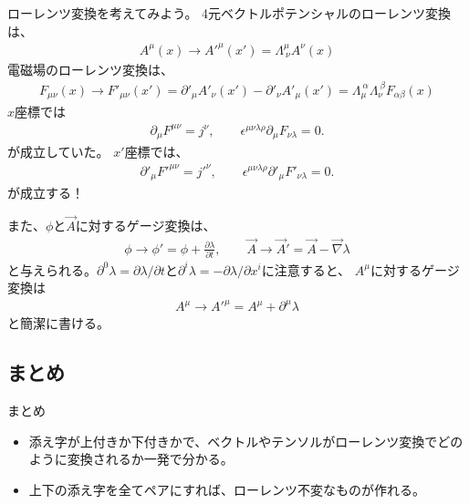 \documentclass[10pt,a4paper]{jarticle}
\begin{document}
ローレンツ変換を考えてみよう。
4元ベクトルポテンシャルのローレンツ変換は、
\begin{align}
A^\mu(x) \to {A'}^\mu(x') = \Lambda^\mu_{~\nu} A^\nu(x)
\end{align}
%
電磁場のローレンツ変換は、
\begin{align}
F_{\mu\nu}(x)
\to
F'_{\mu\nu}(x') = \partial'_\mu A'_\nu(x') - \partial'_\nu A'_\mu(x') = 
\Lambda_\mu^{~\alpha} \Lambda_\nu^{~\beta} F_{\alpha\beta}(x)
\end{align}
%
$x$座標では
\begin{align}
\partial_\mu F^{\mu\nu} = j^\nu, \qquad
\epsilon^{\mu\nu\lambda\rho} \partial_\mu F_{\nu\lambda} = 0.
\end{align}
が成立していた。
$x'$座標では、
\begin{align}
\partial'_\mu {F'}^{\mu\nu} = {j'}^\nu, \qquad
\epsilon^{\mu\nu\lambda\rho} \partial'_\mu {F'}_{\nu\lambda} = 0.
\end{align}
が成立する！

また、$\phi$と$\vec A$に対するゲージ変換は、
\begin{align}
\phi \to \phi' = \phi + \frac{\partial\lambda}{\partial t}, \qquad
\vec A \to \vec A' = \vec A - \vec\nabla \lambda
\end{align}
と与えられる。$\partial^0 \lambda = \partial\lambda/\partial t$と$\partial^i \lambda = -\partial\lambda/\partial x^i$に注意すると、
$A^\mu$に対するゲージ変換は
\begin{align}
A^\mu \to A'^\mu = A^\mu + \partial^\mu \lambda
\end{align}
と簡潔に書ける。



\subsection{まとめ}
\begin{itembox}[l]{まとめ}
\begin{itemize}
\item 添え字が上付きか下付きかで、ベクトルやテンソルがローレンツ変換でどのように変換されるか一発で分かる。
\item 上下の添え字を全てペアにすれば、ローレンツ不変なものが作れる。
\end{itemize}
\end{itembox}
\end{document}
